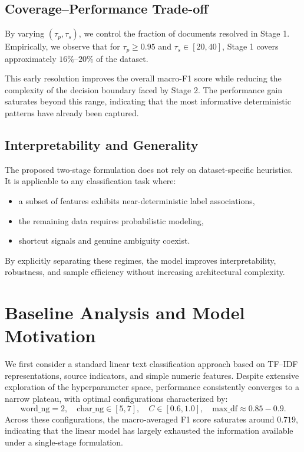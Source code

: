 \subsection{Coverage--Performance Trade-off}

By varying $(\tau_p, \tau_s)$, we control the fraction of documents resolved in Stage 1.
Empirically, we observe that for $\tau_p \ge 0.95$ and $\tau_s \in [20,40]$, Stage 1 covers approximately $16\%$--$20\%$ of the dataset.

This early resolution improves the overall macro-F1 score while reducing the complexity of the decision boundary faced by Stage 2.
The performance gain saturates beyond this range, indicating that the most informative deterministic patterns have already been captured.
\subsection{Interpretability and Generality}

The proposed two-stage formulation does not rely on dataset-specific heuristics.
It is applicable to any classification task where:
\begin{itemize}
	\item a subset of features exhibits near-deterministic label associations,
	\item the remaining data requires probabilistic modeling,
	\item shortcut signals and genuine ambiguity coexist.
\end{itemize}

By explicitly separating these regimes, the model improves interpretability, robustness, and sample efficiency without increasing architectural complexity.
\section{Baseline Analysis and Model Motivation}

We first consider a standard linear text classification approach based on TF--IDF representations, source indicators, and simple numeric features.
Despite extensive exploration of the hyperparameter space, performance consistently converges to a narrow plateau, with optimal configurations characterized by:
\[
\text{word\_ng}=2,\quad \text{char\_ng}\in[5,7],\quad C\in[0.6,1.0],\quad \text{max\_df}\approx0.85{-}0.9.
\]
Across these configurations, the macro-averaged F1 score saturates around $0.719$, indicating that the linear model has largely exhausted the information available under a single-stage formulation.

